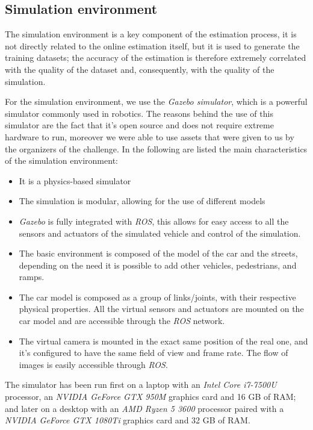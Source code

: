 \documentclass[a4paper,12pt,sort&compress]{article}
\begin{document}
    \subsection{Simulation environment}
    The simulation environment is a key component of the estimation process, it
    is not directly related to the online estimation itself, but it is used to
    generate the training datasets; the accuracy of the estimation is therefore
    extremely correlated with the quality of the dataset and, consequently, with
    the quality of the simulation. 

    For the simulation environment, we use the \textit{Gazebo
    simulator}\citep*{1389727}, which is a powerful simulator commonly used in
    robotics. The reasons behind the use of this simulator are the fact that
    it's open source and does not require extreme hardware to run, moreover we
    were able to use assets that were given to us by the organizers of the
    challenge. In the following are listed the main characteristics of the
    simulation environment:
    \begin{itemize}
        \item It is a physics-based simulator
        \item The simulation is modular, allowing for the use of different
        models 
        \item \textit{Gazebo} is fully integrated with \textit{ROS}, this allows
        for easy access to all the sensors and actuators of the simulated
        vehicle and control of the simulation.
        \item The basic environment is composed of the model of the car and the
        streets, depending on the need it is possible to add other vehicles,
        pedestrians, and ramps.
        \item The car model is composed as a group of links/joints, with their
        respective physical properties. All the virtual sensors and actuators are
        mounted on the car model and are accessible through the \textit{ROS} network.
        \item The virtual camera is mounted in the exact same position of the
        real one, and it's configured to have the same field of view and frame
        rate. The flow of images is easily accessible through \textit{ROS}.
    \end{itemize}

    The simulator has been run first on a laptop with an \textit{Intel Core i7-7500U}
    processor, an \textit{NVIDIA GeForce GTX 950M} graphics card and 16 GB of
    RAM; and later on a desktop with an \textit{AMD Ryzen 5 3600} processor paired with a
    \textit{NVIDIA GeForce GTX 1080Ti} graphics card and 32 GB of RAM.  
    
\end{document}
